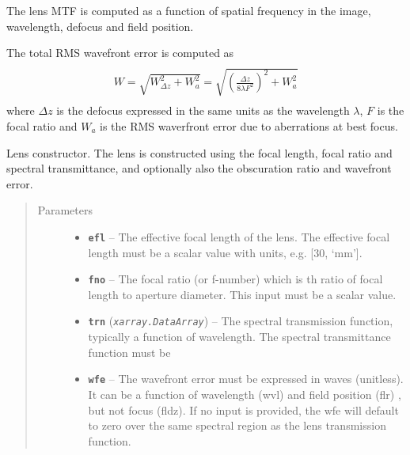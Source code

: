 \documentclass[a4paper,10pt,english]{sphinxmanual}
\begin{document}
\begin{fulllineitems}
\begin{quote}
\begin{description}
\begin{itemize}
\end{itemize}

\end{description}\end{quote}

The lens MTF is computed as a function of spatial frequency in the image, wavelength, defocus and field position.

The total RMS wavefront error is computed as
\begin{align*}\begin{aligned}
\begin{split}W=\sqrt{W_{\Delta\!z}^{2}+W_{a}^{2}}=\sqrt{\left(\frac{\Delta\!z}{8\lambda F^{2}}\right)^{2}+W_{a}^{2}}\end{split}\end{aligned}\end{align*}
where \(\Delta\!z\) is the defocus expressed in the same units as the wavelength \(\lambda\), \(F\) is
the focal ratio and \(W_a\) is the RMS waverfront error due to aberrations at best focus.

Lens constructor.
The lens is constructed using the focal length, focal ratio and spectral transmittance, and
optionally also the obscuration ratio and wavefront error.
\begin{quote}\begin{description}
\item[{Parameters}] \leavevmode\begin{itemize}
\item {} 
\textbf{\texttt{efl}} -- The effective focal length of the lens. The effective focal length must be a scalar value
with units, e.g. {[}30, `mm'{]}.

\item {} 
\textbf{\texttt{fno}} -- The focal ratio (or f-number) which is th ratio of focal length to aperture diameter. This input
must be a scalar value.

\item {} 
\textbf{\texttt{trn}} (\emph{\texttt{xarray.DataArray}}) -- The spectral transmission function, typically a function of wavelength. The spectral
transmittance function must be

\item {} 
\textbf{\texttt{wfe}} -- The wavefront error must be expressed in waves (unitless). It can be a function of
wavelength (wvl) and field position (flr) , but not focus (fldz). If no input is provided, the wfe
will default to zero over the same spectral region as the lens transmission function.


\end{itemize}
\end{description}
\end{quote}
\end{fulllineitems}
\end{document}
